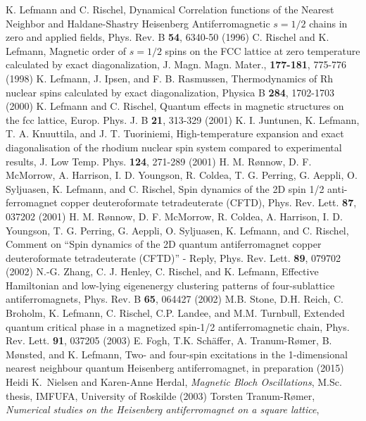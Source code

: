 \documentclass{article}
\begin{document}
\begin{thebibliography}{99}
 K. Lefmann and C. Rischel, Dynamical Correlation functions of the Nearest Neighbor and Haldane-Shastry Heisenberg Antiferromagnetic $s=1/2$ chains in zero and applied fields, Phys. Rev. B {\bf 54}, 6340-50 (1996) 
 C. Rischel and K. Lefmann, Magnetic order of $s=1/2$ spins on the FCC lattice at zero temperature calculated by exact diagonalization, J. Magn. Magn. Mater., {\bf 177-181}, 775-776 (1998) 
 K. Lefmann, J. Ipsen, and F. B. Rasmussen, Thermodynamics of Rh nuclear spins calculated by exact diagonalization, Physica B {\bf 284}, 1702-1703 (2000) 
 K. Lefmann and C. Rischel, Quantum effects in magnetic structures on the fcc lattice, Europ. Phys. J. B {\bf 21}, 313-329 (2001)
 K. I. Juntunen, K. Lefmann, T. A. Knuuttila, and J. T. Tuoriniemi, High-temperature expansion and exact diagonalisation of the rhodium nuclear spin system compared to experimental results, J. Low Temp. Phys. {\bf 124}, 271-289 (2001)
 H. M. R\o nnow, D. F. McMorrow, A. Harrison, I. D. Youngson, R. Coldea, T. G. Perring, G. Aeppli, O. Syljuasen, K. Lefmann, and C. Rischel, Spin dynamics of the 2D spin 1/2 anti-ferromagnet copper deuteroformate tetradeuterate (CFTD), Phys. Rev. Lett. {\bf 87}, 037202 (2001) 
 H. M. R\o nnow, D. F. McMorrow, R. Coldea, A. Harrison, I. D. Youngson, T. G. Perring, G. Aeppli, O. Syljuasen, K. Lefmann, and C. Rischel, Comment on “Spin dynamics of the 2D quantum antiferromagnet copper deuteroformate tetradeuterate (CFTD)” - Reply, Phys. Rev. Lett. {\bf 89}, 079702 (2002)
 N.-G. Zhang, C. J. Henley, C. Rischel, and K. Lefmann, Effective Hamiltonian and low-lying eigenenergy clustering patterns of four-sublattice antiferromagnets, Phys. Rev. B {\bf 65}, 064427 (2002) 
 M.B. Stone, D.H. Reich, C. Broholm, K. Lefmann, C. Rischel, C.P.  Landee, and M.M. Turnbull, Extended quantum critical phase in a magnetized spin-1/2 antiferromagnetic chain, Phys. Rev. Lett. {\bf 91}, 037205 (2003) 
 E. Fogh, T.K. Sch\"affer, A. Tranum-R\o mer, B. M\o nsted, and K. Lefmann,
Two- and four-spin excitations in the 1-dimensional nearest neighbour quantum Heisenberg antiferromagnet,
in preparation (2015)
 Heidi K.\ Nielsen and Karen-Anne Herdal, {\em Magnetic Bloch Oscillations}, M.Sc. thesis, 
   IMFUFA, University of Roskilde (2003)
 Torsten Tranum-R\o mer, 
{\em Numerical studies on the Heisenberg antiferromagnet on a square lattice}, 

\end{thebibliography}
\end{document}
